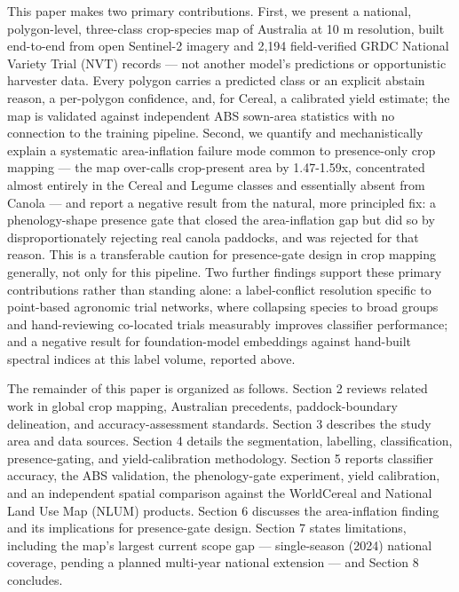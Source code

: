 This paper makes two primary contributions. First, we present a national, polygon-level, three-class crop-species map of Australia at 10 m resolution, built end-to-end from open Sentinel-2 imagery and 2,194 field-verified GRDC National Variety Trial (NVT) records --- not another model's predictions or opportunistic harvester data. Every polygon carries a predicted class or an explicit abstain reason, a per-polygon confidence, and, for Cereal, a calibrated yield estimate; the map is validated against independent ABS sown-area statistics with no connection to the training pipeline. Second, we quantify and mechanistically explain a systematic area-inflation failure mode common to presence-only crop mapping --- the map over-calls crop-present area by 1.47-1.59x, concentrated almost entirely in the Cereal and Legume classes and essentially absent from Canola --- and report a negative result from the natural, more principled fix: a phenology-shape presence gate that closed the area-inflation gap but did so by disproportionately rejecting real canola paddocks, and was rejected for that reason. This is a transferable caution for presence-gate design in crop mapping generally, not only for this pipeline. Two further findings support these primary contributions rather than standing alone: a label-conflict resolution specific to point-based agronomic trial networks, where collapsing species to broad groups and hand-reviewing co-located trials measurably improves classifier performance; and a negative result for foundation-model embeddings against hand-built spectral indices at this label volume, reported above.

The remainder of this paper is organized as follows. Section 2 reviews related work in global crop mapping, Australian precedents, paddock-boundary delineation, and accuracy-assessment standards. Section 3 describes the study area and data sources. Section 4 details the segmentation, labelling, classification, presence-gating, and yield-calibration methodology. Section 5 reports classifier accuracy, the ABS validation, the phenology-gate experiment, yield calibration, and an independent spatial comparison against the WorldCereal and National Land Use Map (NLUM) products. Section 6 discusses the area-inflation finding and its implications for presence-gate design. Section 7 states limitations, including the map's largest current scope gap --- single-season (2024) national coverage, pending a planned multi-year national extension --- and Section 8 concludes.
